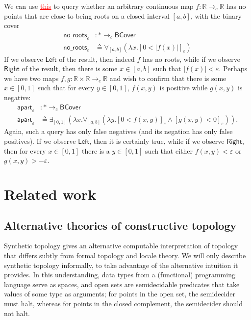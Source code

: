 \documentclass[conference]{IEEEtran}
\newcommand{\cto}{\to_c}
\newcommand{\R}{\mathbb{R}}
\newcommand{\One}{\ast}
\newcommand{\BCover}{\mathsf{BCover}}
\newcommand{\grammar}[1]{\textcolor{red}{\underline{#1}}}
\begin{document}
We can use \grammar{this} to query whether an arbitrary continuous map $f : \R \cto \R$ has no points that are close to being roots on a closed interval $[a, b]$, with the binary cover
\begin{align*}
\mathsf{no\_roots}_{\varepsilon} &: \One \cto \BCover
\\ \mathsf{no\_roots}_\varepsilon &\triangleq
  \forall_{[a,b]}(\lambda x. [ 0 < |f(x)| ]_\varepsilon)
\end{align*}
If we observe $\mathsf{Left}$ of the result, then indeed $f$ has no roots, while if we observe $\mathsf{Right}$ of the result, then there is some $x \in [a, b]$ such that $|f(x)| < \varepsilon$. Perhaps we have two maps $f, g : \R \times \R \cto \R$ and wish to confirm that there is some $x \in [0,1]$ such that for every $y \in [0,1]$, $f(x, y)$ is positive while $g(x,y)$ is negative:
\begin{align*}
\mathsf{apart}_{\varepsilon} &: \One \cto \BCover
\\ \mathsf{apart}_\varepsilon &\triangleq
  \exists_{[0,1]}(\lambda x. \forall_{[a,b]}(\lambda y. [ 0 < f(x, y) ]_\varepsilon \wedge [g(x, y) < 0]_\varepsilon)).
\end{align*}
Again, such a query has only false negatives (and its negation has only false positives). If we observe $\mathsf{Left}$, then it is certainly true, while if we observe $\mathsf{Right}$, then for every $x \in [0,1]$ there is a $y \in [0,1]$ such that either $f(x, y) < \varepsilon$ or $g(x, y) > -\varepsilon$.

\section{Related work}

\subsection{Alternative theories of constructive topology}

Synthetic topology gives an alternative computable interpretation of topology that differs subtly from formal topology and locale theory\cite{escardo2004, lesnik}. We will only describe synthetic topology informally, to take advantage of the alternative intuition it provides. In this understanding, data types from a (functional) programming language serve as spaces, and open sets are semidecidable predicates that take values of some type as arguments; for points in the open set, the semidecider must halt, whereas for points in the closed complement, the semidecider should not halt.
\end{document}
